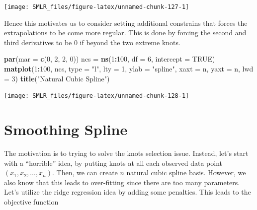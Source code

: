 \documentclass[
]{book}
\newenvironment{Shaded}{\begin{snugshade}}{\end{snugshade}}
\newcommand{\AttributeTok}[1]{\textcolor[rgb]{0.13,0.29,0.53}{#1}}
\newcommand{\ConstantTok}[1]{\textcolor[rgb]{0.56,0.35,0.01}{#1}}
\newcommand{\DecValTok}[1]{\textcolor[rgb]{0.00,0.00,0.81}{#1}}
\newcommand{\FunctionTok}[1]{\textcolor[rgb]{0.13,0.29,0.53}{\textbf{#1}}}
\newcommand{\NormalTok}[1]{#1}
\newcommand{\OtherTok}[1]{\textcolor[rgb]{0.56,0.35,0.01}{#1}}
\newcommand{\SpecialCharTok}[1]{\textcolor[rgb]{0.81,0.36,0.00}{\textbf{#1}}}
\newcommand{\StringTok}[1]{\textcolor[rgb]{0.31,0.60,0.02}{#1}}
\theoremstyle{definition}
\theoremstyle{definition}
\theoremstyle{definition}
\theoremstyle{definition}
\theoremstyle{remark}
\begin{document}
\begin{center}\texttt{[image: SMLR\_files/figure-latex/unnamed-chunk-127-1]} \end{center}

Hence this motivates us to consider setting additional constrains that forces the extrapolations to be come more regular. This is done by forcing the second and third derivatives to be 0 if beyond the two extreme knots.

\begin{Shaded}
\begin{Highlighting}[]
    \FunctionTok{par}\NormalTok{(}\AttributeTok{mar =} \FunctionTok{c}\NormalTok{(}\DecValTok{0}\NormalTok{, }\DecValTok{2}\NormalTok{, }\DecValTok{2}\NormalTok{, }\DecValTok{0}\NormalTok{))}
\NormalTok{    ncs }\OtherTok{=} \FunctionTok{ns}\NormalTok{(}\DecValTok{1}\SpecialCharTok{:}\DecValTok{100}\NormalTok{, }\AttributeTok{df =} \DecValTok{6}\NormalTok{, }\AttributeTok{intercept =} \ConstantTok{TRUE}\NormalTok{)}
    \FunctionTok{matplot}\NormalTok{(}\DecValTok{1}\SpecialCharTok{:}\DecValTok{100}\NormalTok{, ncs, }\AttributeTok{type =} \StringTok{"l"}\NormalTok{, }\AttributeTok{lty =} \DecValTok{1}\NormalTok{, }\AttributeTok{ylab =} \StringTok{"spline"}\NormalTok{,}
            \AttributeTok{xaxt =} \StringTok{\textquotesingle{}n\textquotesingle{}}\NormalTok{, }\AttributeTok{yaxt =} \StringTok{\textquotesingle{}n\textquotesingle{}}\NormalTok{, }\AttributeTok{lwd =} \DecValTok{3}\NormalTok{)}
    \FunctionTok{title}\NormalTok{(}\StringTok{"Natural Cubic Spline"}\NormalTok{)}
\end{Highlighting}
\end{Shaded}

\begin{center}\texttt{[image: SMLR\_files/figure-latex/unnamed-chunk-128-1]} \end{center}

\hypertarget{smoothing-spline}{%
\section{Smoothing Spline}\label{smoothing-spline}}

The motivation is to trying to solve the knots selection issue. Instead, let's start with a ``horrible'' idea, by putting knots at all each observed data point \((x_1, x_2, \ldots, x_n)\). Then, we can create \(n\) natural cubic spline basis. However, we also know that this leads to over-fitting since there are too many parameters. Let's utilize the ridge regression idea by adding some penalties. This leads to the objective function
\end{document}
